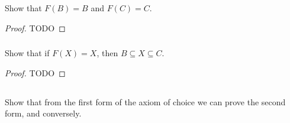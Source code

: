 \documentclass{report}
\begin{document}
\subsubsection{}%

Show that $F(B) = B$ and $F(C) = C$.

\begin{proof}

  TODO

\end{proof}

\subsubsection{}%

Show that if $F(X) = X$, then $B \subseteq X \subseteq C$.

\begin{proof}

  TODO

\end{proof}

\subsection{}%

Show that from the first form of the axiom of choice we can prove the second
  form, and conversely.
\end{document}
